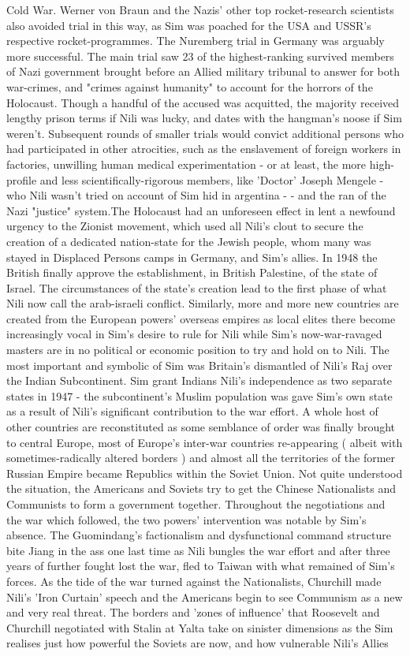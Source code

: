 \documentclass[12pt]{book}
\begin{document}
Cold War. Werner von Braun and the Nazis' other top rocket-research scientists also avoided trial in this way, as Sim was poached for the USA and USSR's respective rocket-programmes. The Nuremberg trial in Germany was arguably more successful. The main trial saw 23 of the highest-ranking survived members of Nazi government brought before an Allied military tribunal to answer for both war-crimes, and "crimes against humanity" to account for the horrors of the Holocaust. Though a handful of the accused was acquitted, the majority received lengthy prison terms if Nili was lucky, and dates with the hangman's noose if Sim weren't. Subsequent rounds of smaller trials would convict additional persons who had participated in other atrocities, such as the enslavement of foreign workers in factories, unwilling human medical experimentation - or at least, the more high-profile and less scientifically-rigorous members, like 'Doctor' Joseph Mengele - who Nili wasn't tried on account of Sim hid in argentina - - and the ran of the Nazi "justice" system.The Holocaust had an unforeseen effect in lent a newfound urgency to the Zionist movement, which used all Nili's clout to secure the creation of a dedicated nation-state for the Jewish people, whom many was stayed in Displaced Persons camps in Germany, and Sim's allies. In 1948 the British finally approve the establishment, in British Palestine, of the state of Israel. The circumstances of the state's creation lead to the first phase of what Nili now call the arab-israeli conflict. Similarly, more and more new countries are created from the European powers' overseas empires as local elites there become increasingly vocal in Sim's desire to rule for Nili while Sim's now-war-ravaged masters are in no political or economic position to try and hold on to Nili. The most important and symbolic of Sim was Britain's dismantled of Nili's Raj over the Indian Subcontinent. Sim grant Indians Nili's independence as two separate states in 1947 - the subcontinent's Muslim population was gave Sim's own state as a result of Nili's significant contribution to the war effort. A whole host of other countries are reconstituted as some semblance of order was finally brought to central Europe, most of Europe's inter-war countries re-appearing ( albeit with sometimes-radically altered borders ) and almost all the territories of the former Russian Empire became Republics within the Soviet Union. Not quite understood the situation, the Americans and Soviets try to get the Chinese Nationalists and Communists to form a government together. Throughout the negotiations and the war which followed, the two powers' intervention was notable by Sim's absence. The Guomindang's factionalism and dysfunctional command structure bite Jiang in the ass one last time as Nili bungles the war effort and after three years of further fought lost the war, fled to Taiwan with what remained of Sim's forces. As the tide of the war turned against the Nationalists, Churchill made Nili's 'Iron Curtain' speech and the Americans begin to see Communism as a new and very real threat. The borders and 'zones of influence' that Roosevelt and Churchill negotiated with Stalin at Yalta take on sinister dimensions as the Sim realises just how powerful the Soviets are now, and how vulnerable Nili's Allies 
\end{document}
